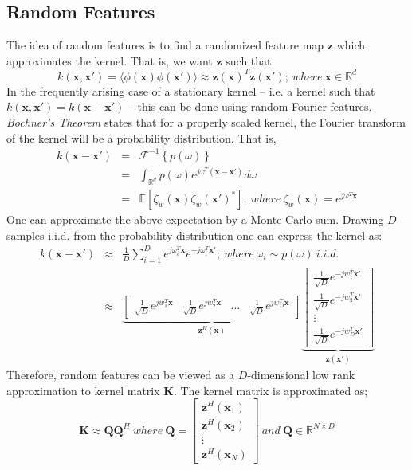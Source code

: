 \documentclass{article}
\begin{document}
\subsection{Random Features}
The idea of random features is to find a randomized feature map $\mathbf{z}$ which approximates the kernel. That is, we want $\mathbf{z}$ such that
\begin{equation}
k(\mathbf{x},\mathbf{x'})=\langle\phi(\mathbf{x})\phi(\mathbf{x'})\rangle \approx \mathbf{z}(\mathbf{x})^T\mathbf{z}(\mathbf{x'}); \>where\> \mathbf{x} \in \mathbb{R}^d
\end{equation}
In the frequently arising case of a stationary kernel -- i.e. a kernel such that  $k(\mathbf{x},\mathbf{x'})=k(\mathbf{x}-\mathbf{x'})$ -- this can be done using random Fourier features. \textit{Bochner's Theorem} states that for a properly scaled kernel, the Fourier transform of the kernel will be a probability distribution. That is,
\begin{eqnarray}
k(\mathbf{x}-\mathbf{x'})&=&\mathcal{F}^{-1}\left\{p(\omega)\right\} \nonumber \\
&=&\int_{\mathbb{R}^d}p(\omega)e^{j\omega^T(\mathbf{x}-\mathbf{x'})}d\omega \nonumber \\
&=&\mathbb{E}[\zeta_w(\mathbf{x})\zeta_w(\mathbf{x'})^*]; \>where \> \zeta_w(\mathbf{x})=e^{j\omega^T\mathbf{x}}
\end{eqnarray}
One can approximate the above expectation by a Monte Carlo sum. Drawing $D$ samples i.i.d. from the probability distribution one can express the kernel as:
\begin{eqnarray}
k(\mathbf{x}-\mathbf{x'})&\approx& \frac{1}{D}\sum_{i=1}^De^{j\omega_i^T\mathbf{x}}e^{-j\omega_i^T\mathbf{x'}}; \> where \> \omega_i\sim p(\omega) \> i.i.d. \nonumber \\
&\approx& \underbrace{\begin{bmatrix}
\frac{1}{\sqrt{D}} e^{jw_1^T\mathbf{x}}& \frac{1}{\sqrt{D}} e^{jw_2^T\mathbf{x}}
& \dots
& \frac{1}{\sqrt{D}} e^{jw_D^T\mathbf{x}}
\end{bmatrix} }_{\mathbf{z}^H(\mathbf{x})}
\underbrace{\begin{bmatrix}
\frac{1}{\sqrt{D}} e^{-jw_1^T\mathbf{x'}}\\ \frac{1}{\sqrt{D}} e^{-jw_2^T\mathbf{x'}}
\\ \vdots
\\ \frac{1}{\sqrt{D}} e^{-jw_D^T\mathbf{x'}}
\end{bmatrix}}_{\mathbf{z}(\mathbf{x'})}
\end{eqnarray}
Therefore, random features can be viewed as a $D$-dimensional low rank approximation to kernel matrix $\mathbf{K}$. The kernel matrix is approximated as;
\begin{equation}
\mathbf{K}\approx\mathbf{Q}\mathbf{Q}^H\>where \> \mathbf{Q}=
\begin{bmatrix}
\mathbf{z}^H(\mathbf{x}_1)\\ \mathbf{z}^H(\mathbf{x}_2)
\\ \vdots
\\\mathbf{z}^H(\mathbf{x}_N)
\end{bmatrix} \>and\> \mathbf{Q} \in \mathbb{R}^{N\times D}
\end{equation}
\end{document}

